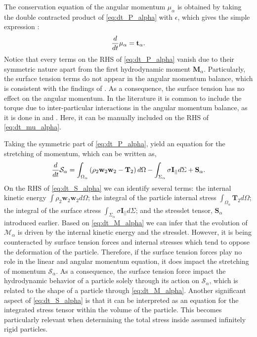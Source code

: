 The conservation equation of the angular momentum $\mu_\alpha$ is obtained by taking the double contracted product of \ref{eq:dt_P_alpha} with $\epsilon$, which gives the simple expression :
\begin{equation}
    \frac{d}{d t}\mu_\alpha
    =  
    \textbf{t}_\alpha.
    \label{eq:dt_mu_alpha}
\end{equation}
Notice that every terms on the RHS of \ref{eq:dt_P_alpha} vanish due to their symmetric nature apart from the first hydrodynamic moment $\textbf{M}_\alpha$.
Particularly, the surface tension terms do not appear in the angular momentum balance, which is consistent with the findings of \citet{hesla1993note}. 
As a consequence, the surface tension has no effect on the angular momentum. 
In the literature it is common to include the torque due to inter-particular interactions in the angular momentum balance, as it is done in \citet{jackson1997locally} and \citet{zhang1997momentum}.
Here, it can be manually included on the RHS of \ref{eq:dt_mu_alpha}. 


Taking the symmetric part of \ref{eq:dt_P_alpha}, yield an equation for the stretching of momentum, which can be written as,
\begin{equation}    
    \frac{d}{d t} \mathcal{S}_\alpha
    =  \int_{\Omega_\alpha} \left(
        \rho_2\textbf{w}_2 \textbf{w}_2
        - \mathbf{T}_2
        \right) d\Omega
        - \int_{\Sigma_\alpha} 
        \sigma \textbf{I}_{||}
        d\Sigma
        + \textbf{S}_\alpha.
    \label{eq:dt_S_alpha}
\end{equation}
On the RHS of \ref{eq:dt_S_alpha} we can identify several terms: 
the internal kinetic energy $\int \rho_2\textbf{w}_2\textbf{w}_2 d\Omega$; 
the integral of the particle internal stress $\int_{\Omega_\alpha} \mathbf{T}_2 d\Omega$; 
the integral of the surface stress $\int_{\Sigma_\alpha} \sigma \textbf{I}_{||} d\Sigma$; 
and the stresslet tensor, $\textbf{S}_\alpha$ introduced earlier.
Based on \ref{eq:dt_M_alpha} we can infer that the evolution of $\mathcal{M}_\alpha$ is driven by the internal kinetic energy and the stresslet.
However, it is being counteracted by surface tension forces and internal stresses which tend to oppose the deformation of the particle. 
Therefore, if the surface tension forces play no role in the linear and angular momentum equation, it does impact the stretching of momentum $\mathcal{S}_\alpha$.
As a consequence, the surface tension force impact the hydrodynamic behavior of a particle solely through its action on $\mathcal{S}_\alpha$, which is related to the shape of a particle through \ref{eq:dt_M_alpha}.
Another significant aspect of \ref{eq:dt_S_alpha} is that it can be interpreted as an equation for the integrated stress tensor within the volume of the particle.
This becomes particularly relevant when determining the total stress inside assumed infinitely rigid particles. 


